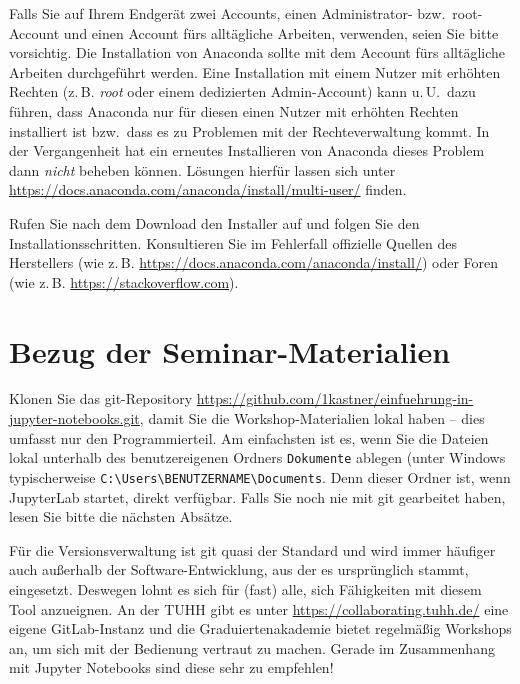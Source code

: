 \documentclass{tufte-handout}
\begin{document}
Falls Sie auf Ihrem Endgerät zwei Accounts, einen Administrator- bzw.\ root-Account und einen Account fürs alltägliche Arbeiten, verwenden, seien Sie bitte vorsichtig.
Die Installation von Anaconda sollte mit dem Account fürs alltägliche Arbeiten durchgeführt werden.
Eine Installation mit einem Nutzer mit erhöhten Rechten (z.\,B. \emph{root} oder einem dedizierten Admin-Account) kann u.\,U.\ dazu führen, dass Anaconda nur für diesen einen Nutzer mit erhöhten Rechten installiert ist bzw.\ dass es zu Problemen mit der Rechteverwaltung kommt.
In der Vergangenheit hat ein erneutes Installieren von Anaconda dieses Problem dann \emph{nicht} beheben können.
Lösungen hierfür lassen sich unter \url{https://docs.anaconda.com/anaconda/install/multi-user/} finden.

Rufen Sie nach dem Download den Installer auf und folgen Sie den Installationsschritten.
Konsultieren Sie im Fehlerfall offizielle Quellen des Herstellers (wie z.\,B. \url{https://docs.anaconda.com/anaconda/install/}) oder Foren (wie z.\,B. \url{https://stackoverflow.com}).


\section{Bezug der Seminar-Materialien}
\label{sec:git-clone}

Klonen Sie das git-Repository
\url{https://github.com/1kastner/einfuehrung-in-jupyter-notebooks.git},
damit Sie die Workshop-Materialien lokal haben -- dies umfasst nur den Programmierteil.
Am einfachsten ist es, wenn Sie die Dateien lokal unterhalb des benutzer\-eigenen Ordners \texttt{Dokumente} ablegen
(unter Windows typischerweise \texttt{C:\textbackslash{}Users\textbackslash{}BENUTZERNAME\textbackslash{}Documents}.
Denn dieser Ordner ist, wenn JupyterLab startet, direkt verfügbar.
Falls Sie noch nie mit git gearbeitet haben, lesen Sie bitte die nächsten Absätze.

Für die Versionsverwaltung ist git quasi der Standard und wird immer häufiger auch außerhalb der Software-Entwicklung, aus der es ursprünglich stammt, eingesetzt.
Deswegen lohnt es sich für (fast) alle, sich Fähigkeiten mit diesem Tool anzueignen.
An der TUHH gibt es unter
\url{https://collaborating.tuhh.de/}
eine eigene GitLab-Instanz und die Graduiertenakademie bietet regelmäßig Workshops an, um sich mit der Bedienung vertraut zu machen.
Gerade im Zusammenhang mit Jupyter Notebooks sind diese sehr zu empfehlen!
\end{document}

